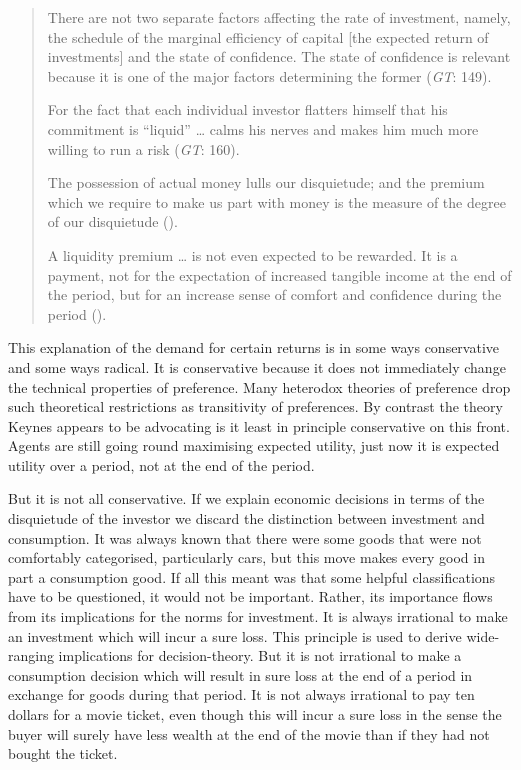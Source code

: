 \documentclass[
  11pt,
  letterpaper,
  DIV=11,
  numbers=noendperiod,
  twoside]{scrartcl}
\begin{document}
\begin{quote}
There are not two separate factors affecting the rate of investment,
namely, the schedule of the marginal efficiency of capital {[}the
expected return of investments{]} and the state of confidence. The state
of confidence is relevant because it is one of the major factors
determining the former (\emph{GT}: 149).

For the fact that each individual investor flatters himself that his
commitment is ``liquid'' \ldots{} calms his nerves and makes him much
more willing to run a risk (\emph{GT}: 160).

The possession of actual money lulls our disquietude; and the premium
which we require to make us part with money is the measure of the degree
of our disquietude ().

A liquidity premium \ldots{} is not even expected to be rewarded. It is
a payment, not for the expectation of increased tangible income at the
end of the period, but for an increase sense of comfort and confidence
during the period ().
\end{quote}

This explanation of the demand for certain returns is in some ways
conservative and some ways radical. It is conservative because it does
not immediately change the technical properties of preference. Many
heterodox theories of preference drop such theoretical restrictions as
transitivity of preferences. By contrast the theory Keynes appears to be
advocating is it least in principle conservative on this front. Agents
are still going round maximising expected utility, just now it is
expected utility over a period, not at the end of the period.

But it is not all conservative. If we explain economic decisions in
terms of the disquietude of the investor we discard the distinction
between investment and consumption. It was always known that there were
some goods that were not comfortably categorised, particularly cars, but
this move makes every good in part a consumption good. If all this meant
was that some helpful classifications have to be questioned, it would
not be important. Rather, its importance flows from its implications for
the norms for investment. It is always irrational to make an investment
which will incur a sure loss. This principle is used to derive
wide-ranging implications for decision-theory. But it is not irrational
to make a consumption decision which will result in sure loss at the end
of a period in exchange for goods during that period. It is not always
irrational to pay ten dollars for a movie ticket, even though this will
incur a sure loss in the sense the buyer will surely have less wealth at
the end of the movie than if they had not bought the ticket.
\end{document}
